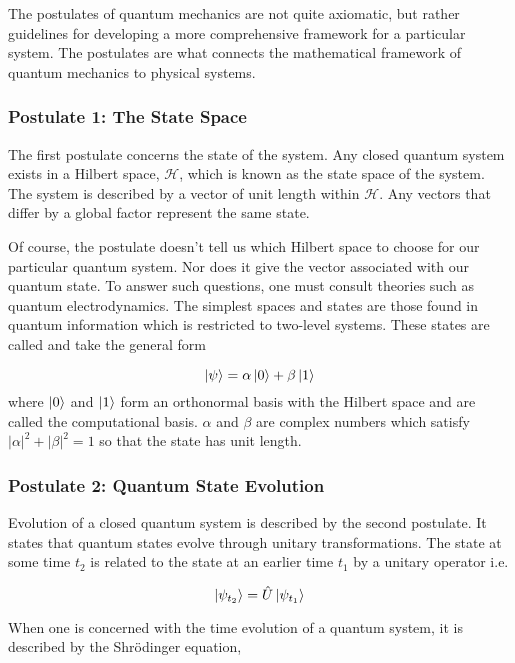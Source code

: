 The postulates of quantum mechanics are not quite axiomatic, but rather guidelines for developing a more comprehensive framework for a particular system. The postulates are what connects the mathematical framework of quantum mechanics to physical systems.

\subsubsection*{Postulate 1: The State Space}

The first postulate concerns the state of the system. Any closed quantum system exists in a Hilbert space, $\mathcal{H}$, which is known as the state space of the system. The system is described by a vector of unit length within $\mathcal{H}$. Any vectors that differ by a global factor represent the same state.

Of course, the postulate doesn't tell us which Hilbert space to choose for our particular quantum system. Nor does it give the vector associated with our quantum state. To answer such questions, one must consult theories such as quantum electrodynamics. The simplest spaces and states are those found in quantum information which is restricted to two-level systems. These states are called  and take the general form

\begin{equation}
	\ket{\psi} = \alpha\ket{0} + \beta\ket{1}
\end{equation} 
where $\ket{0}$ and $\ket{1}$ form an orthonormal basis with the Hilbert space and are called the computational basis. $\alpha$ and $\beta$ are complex numbers which satisfy $|\alpha|^2 + |\beta|^2 = 1$ so that the state has unit length.

\subsubsection*{Postulate 2: Quantum State Evolution}

Evolution of a closed quantum system is described by the second postulate. It states that quantum states evolve through unitary transformations. The state at some time $t_2$ is related to the state at an earlier time $t_1$ by a unitary operator i.e.

\begin{equation}
	\ket{\psi_{t_2}} = \hat{U}\ket{\psi_{t_1}}
\end{equation}

When one is concerned with the time evolution of a quantum system, it is described by the Shr\"{o}dinger equation,

